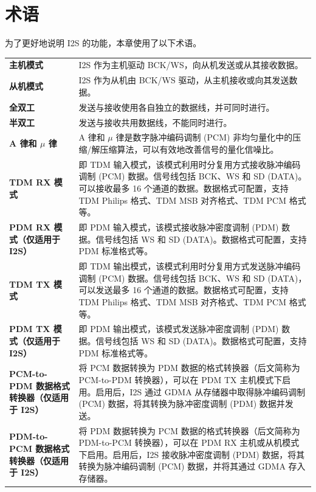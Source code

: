 \documentclass[main\_\_CN.tex]{subfiles}
\begin{document}
\section{术语}
\label{sec:i2s-term}

为了更好地说明 I2S 的功能，本章使用了以下术语。 

\begin{longtable}[c]{ R{5cm} p{10cm} }
\textbf{主机模式}     & I2S 作为主机驱动 BCK/WS，向从机发送或从其接收数据。 \\ 
\textbf{从机模式}     & I2S 作为从机由 BCK/WS 驱动，从主机接收或向其发送数据。 \\
\textbf{全双工} & 发送与接收使用各自独立的数据线，并可同时进行。\\
\textbf{半双工} & 发送与接收共用数据线，不能同时进行。\\
\textbf{A 律和 $\mu$ 律} & A 律和 \textrm{$\mu$} 律是数字脉冲编码调制 (PCM) 非均匀量化中的压缩/解压缩算法，可以有效地改善信号的量化信噪比。 \\
\textbf{TDM RX 模式} & 即 TDM 输入模式，该模式利用时分复用方式接收脉冲编码调制 (PCM) 数据。信号线包括 BCK、WS 和 SD (DATA)。可以接收最多 16 个通道的数据。数据格式可配置，支持 TDM Philips 格式、TDM MSB 对齐格式、TDM PCM 格式等。\\
\textbf{PDM RX 模式（仅适用于 I2S）} & 即 PDM 输入模式，该模式接收脉冲密度调制 (PDM) 数据。信号线包括 WS 和 SD (DATA)。数据格式可配置，支持 PDM 标准格式等。\\
\textbf{TDM TX 模式} & 即 TDM 输出模式，该模式利用时分复用方式发送脉冲编码调制 (PCM) 数据。信号线包括 BCK、WS 和 SD (DATA)，可以发送最多 16 个通道的数据。数据格式可配置，支持 TDM Philips 格式、TDM MSB 对齐格式、TDM PCM 格式等。\\
\textbf{PDM TX 模式（仅适用于 I2S）} & 即 PDM 输出模式，该模式发送脉冲密度调制 (PDM) 数据。信号线包括 WS 和 SD (DATA)。数据格式可配置，支持 PDM 标准格式等。\\
\textbf{PCM-to-PDM 数据格式转换器（仅适用于 I2S）} & 将 PCM 数据转换为 PDM 数据的格式转换器（后文简称为 PCM-to-PDM 转换器），可以在 PDM TX 主机模式下启用。启用后，I2S 通过 GDMA 从存储器中取得脉冲编码调制 (PCM) 数据，将其转换为脉冲密度调制 (PDM) 数据并发送。\\
\textbf{PDM-to-PCM 数据格式转换器（仅适用于 I2S）} & 将 PDM 数据转换为 PCM 数据的格式转换器（后文简称为 PDM-to-PCM 转换器），可以在 PDM RX 主机或从机模式下启用。启用后，I2S 接收脉冲密度调制 (PDM) 数据，将其转换为脉冲编码调制 (PCM) 数据，并将其通过 GDMA 存入存储器。
\end{longtable}
\end{document}
